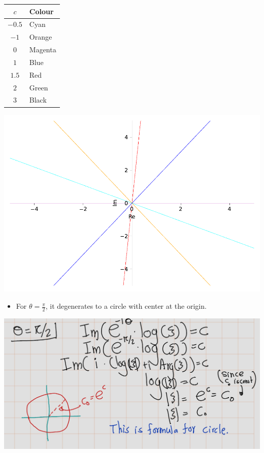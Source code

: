 \documentclass[
]{book}
\providecommand{\tightlist}{%
  \setlength{\itemsep}{0pt}\setlength{\parskip}{0pt}}
\theoremstyle{definition}
\theoremstyle{definition}
\theoremstyle{definition}
\theoremstyle{definition}
\theoremstyle{remark}
\begin{document}
\begin{longtable}[]{@{}cl@{}}
\toprule\noalign{}
\(c\) & Colour \\
\midrule\noalign{}
\endhead
\bottomrule\noalign{}
\endlastfoot
\(-0.5\) & Cyan \\
\(-1\) & Orange \\
\(0\) & Magenta \\
\(1\) & Blue \\
\(1.5\) & Red \\
\(2\) & Green \\
\(3\) & Black \\
\end{longtable}

\includegraphics{ConformalMapping_files/figure-latex/unnamed-chunk-67-1.pdf}

\begin{itemize}
\tightlist
\item
  For \(\theta = \frac{\pi}{2}\), it degenerates to a circle with center at the origin.
\end{itemize}

\includegraphics[width=20.99in]{figures/Helical_Domain/fig3}
\end{document}
